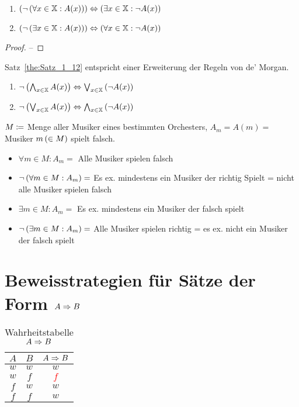 \begin{theorem}~
\begin{enumerate}
\item $\left(\neg \left(\forall x \in \mathbb{X} : A(x)\right)\right) \Leftrightarrow \left(\exists x \in \mathbb{X} : \neg A(x)\right)$
\item $\left(\neg \left(\exists x \in \mathbb{X} : A(x)\right)\right) \Leftrightarrow \left(\forall x \in \mathbb{X} : \neg A(x)\right)$
\end{enumerate}
\label{the:Satz_1_12}
\end{theorem}

\begin{proof}
--
\end{proof}

\begin{note}
Satz~\vref{the:Satz_1_12} entspricht einer Erweiterung der Regeln von de' Morgan.
\begin{enumerate}
\item $\neg \left(\bigwedge_{x \in \mathbb{X}} A(x)\right) \Leftrightarrow \bigvee_{x \in \mathbb{X}} \left(\neg A(x)\right)$
\item $\neg \left(\bigvee_{x \in \mathbb{X}} A(x)\right) \Leftrightarrow \bigwedge_{x \in \mathbb{X}} \left(\neg A(x)\right)$
\end{enumerate}
\end{note}

\begin{example}
$M \mathrel{\mathop:\!\!=}$ Menge aller Musiker eines bestimmten Orchesters, $A_m = A(m) =$ Musiker $m \left(\in M\right)$ spielt falsch.
\begin{itemize}
\item $\forall m \in M : A_m = $ Alle Musiker spielen falsch
\item $\neg \left(\forall m \in M : A_m\right) = $ Es \ac{ex.} mindestens ein Musiker der richtig Spielt = nicht alle Musiker spielen falsch
\item $\exists m \in M: A_m = $ Es \ac{ex.} mindestens ein Musiker der falsch spielt
\item $\neg \left(\exists m \in M: A_m\right) = $ Alle Musiker spielen richtig = es \ac{ex.} nicht ein Musiker der falsch spielt
\end{itemize}
\end{example}

\section{\texorpdfstring{Beweisstrategien für Sätze der Form $A \Rightarrow B$}{Beweisstrategien für Sätze der Form aus A folgt B}}
\begin{table}[htb]
\centering
\begin{tabular}{c|c||c}
$A$ & $B$ & $A \Rightarrow B$\\\hline
$w$ & $w$ & $w$\\
$w$ & $f$ & \textcolor{red}{$f$}\\
$f$ & $w$ & $w$\\
$f$ & $f$ & $w$
\end{tabular}
\caption{Wahrheitstabelle $A \Rightarrow B$}
\label{tab:Wahrheitstabelle_A_Ra_B}
\end{table}


